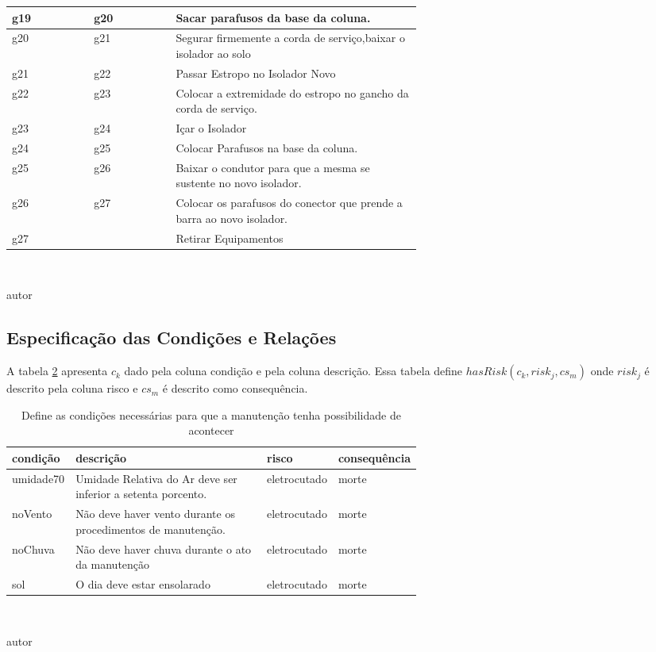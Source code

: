 \begin{table}[H]
\begin{tabular}{|l|l|p{0.6\linewidth}|}
g19 & g20 & Sacar parafusos da base da coluna. \\ \hline
g20 & g21 & Segurar firmemente a corda de serviço,baixar o isolador ao solo \\ \hline
g21 & g22 & Passar Estropo no Isolador Novo \\ \hline
g22 & g23 & Colocar a extremidade do estropo no gancho da corda de serviço. \\ \hline
g23 & g24 & Içar o Isolador \\ \hline
g24 & g25 & Colocar Parafusos na base da coluna. \\ \hline
g25 & g26 & Baixar o condutor para que a mesma se sustente no novo isolador. \\ \hline
g26 & g27 & Colocar os parafusos do conector que prende a barra ao novo isolador. \\ \hline
g27 &     & Retirar Equipamentos \\ \hline
\end{tabular}
\\
\begin{center}
autor
\end{center}
\label{g}
\end{table}

\subsection{Especificação das Condições e Relações}

A tabela \ref{condition} apresenta $c_k$ dado pela coluna condição e pela coluna descrição. Essa tabela define $hasRisk(c_k,risk_j,cs_m)$ onde $risk_j$ é descrito pela coluna risco e $cs_m$ é descrito como consequência. 

\begin{table}[H]
\centering
\caption{Define as condições necessárias para que a manutenção tenha possibilidade de acontecer}
\begin{tabular}{|l|p{0.6\linewidth}|l|l|}
\hline
\textbf{condição} & \textbf{descrição} & \textbf{risco} & \textbf{consequência} \\ \hline
umidade70 & Umidade Relativa do Ar deve ser inferior a setenta porcento. & eletrocutado & morte \\ \hline
noVento & Não deve haver vento durante os procedimentos de manutenção. & eletrocutado & morte \\ \hline
noChuva & Não deve haver chuva durante o ato da manutenção & eletrocutado & morte \\ \hline
sol & O dia deve estar ensolarado & eletrocutado & morte \\ \hline
\end{tabular}
\label{condition}
\\
\begin{center}
autor
\end{center}
\end{table}


